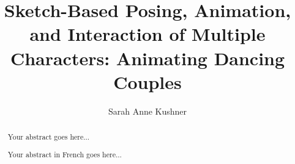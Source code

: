 \documentclass[12pt, a4paper, parskip=full]{memoir} %
\title{Sketch-Based Posing, Animation, and Interaction of Multiple Characters: Animating Dancing Couples} %
\author{Sarah Anne Kushner}
\date{\mydate} %
\begin{document}
\frontmatter
\begin{titlingpage}
\maketitle
\end{titlingpage}


\renewcommand{\abstracttextfont}{\normalfont}
\abstractintoc
\begin{abstract} 
Your abstract goes here... 
\end{abstract}
\abstractintoc

\renewcommand\abstractname{R\'esum\'e}
\begin{abstract} 
Your abstract in French goes here... 
\end{abstract}

\newpage
\end{document}
